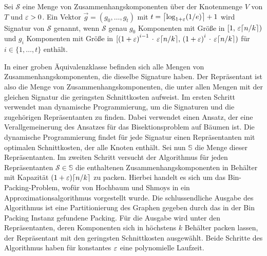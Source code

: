 \begin{defn}[Signatur]\label{defn:signature}
    Sei $\mathcal{S}$ eine Menge von Zusammenhangskomponenten über der Knotenmenge $V$ von $T$ und $\eps > 0$. Ein Vektor $\vec{g} = (g_0, \ldots, g_t)$ mit $t = \ceil*{\log_{1+\eps}(1/e)} + 1$ wird Signatur von $\mathcal{S}$ genannt, wenn $\mathcal{S}$ genau $g_0$ Komponenten mit Größe in $[1,\, \eps \ceil*{n/k})$ und $g_i$ Komponenten mit Größe in $[{(1+\eps)}^{i-1}\, \cdot\, \eps \ceil*{n/k},\, {(1+\eps)}^i\, \cdot \, \eps \ceil*{n/k})$ für $i \in \{1, \ldots, t\}$ enthält.
\end{defn}

In einer groben Äquivalenzklasse befinden sich alle Mengen von Zusammenhangskomponenten, die dieselbe Signature haben.
Der Repräsentant ist also die Menge von Zusammenhangskomponenten, die unter allen Mengen mit der gleichen Signatur die geringsten Schnittkosten aufweist.
Im ersten Schritt verwendet man dynamische Programmierung, um die Signaturen und die zugehörigen Repräsentanten zu finden.
Dabei verwendet einen Ansatz, der eine Verallgemeinerung des Ansatzes für das Bisektionsproblem auf Bäumen ist. \parencite{mcg78, ws11}
Die dynamische Programmierung findet für jede Signatur einen Repräsentanten mit optimalen Schnittkosten, der alle Knoten enthält.
Sei nun $\mathbb{S}$ die Menge dieser Repräsentanten.
Im zweiten Schritt versucht der Algorithmus für jeden Repräsentanten $\mathcal{S} \in \mathbb{S}$ die enthaltenen Zusammenhangskomponenten in Behälter mit Kapazität $(1+\eps)\ceil*{n/k}$ zu packen. 
Hierbei handelt es sich um das Bin-Packing-Problem, wofür von Hochbaum und Shmoys in \parencite{hs86} ein Approximationsalgorithmus vorgestellt wurde.
Die schlussendliche Ausgabe des Algorithmus ist eine Partitionierung des Graphen gegeben durch das in der Bin Packing Instanz gefundene Packing.
Für die Ausgabe wird unter den Repräsentanten, deren Komponenten sich in höchstens $k$ Behälter packen lassen, der Repräsentant mit den geringsten Schnittkosten ausgewählt.
Beide Schritte des Algorithmus haben für konstantes $\eps$ eine polynomielle Laufzeit.

